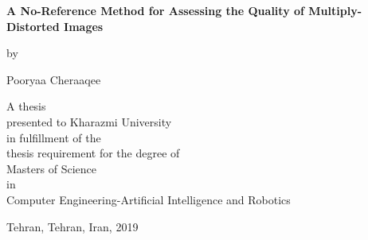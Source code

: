 \pagestyle{empty}

\begin{titlepage}
        \begin{center}
        \vspace*{1.0cm}

        \Huge
        {\bf A No-Reference Method for Assessing the Quality of Multiply-Distorted Images}

        \vspace*{1.0cm}

        \normalsize
        by \\

        \vspace*{1.0cm}

        \Large
        Pooryaa Cheraaqee \\

        \vspace*{3.0cm}

        \normalsize
        A thesis \\
        presented to Kharazmi University \\ 
        in fulfillment of the \\
        thesis requirement for the degree of \\
        Masters of Science \\
        in \\
        Computer Engineering-Artificial Intelligence and Robotics \\

        \vspace*{2.0cm}

        Tehran, Tehran, Iran, 2019 \\

        \vspace*{1.0cm}

        \end{center}
\end{titlepage}

\pagestyle{plain}
\setcounter{page}{2}

